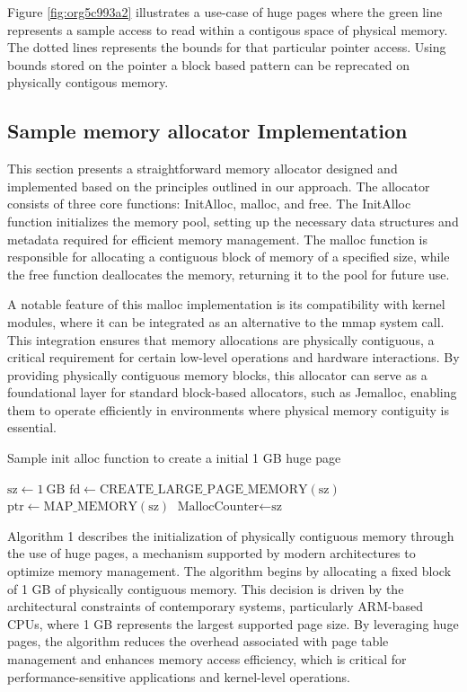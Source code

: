 \documentclass[11pt]{article}
\begin{document}
Figure \ref{fig:org5c993a2} illustrates a use-case of huge pages where the green
line represents a sample access to read within a contigous
space of physical memory. The dotted lines represents the
bounds for that particular pointer access. Using bounds
stored on the pointer a block based pattern can be reprecated
on physically contigous memory. 

\subsection{Sample memory allocator Implementation}
\label{sec:org61472fd}
This section presents a straightforward memory allocator designed and implemented based on the 
principles outlined in our approach. The allocator consists of three core functions: InitAlloc, 
malloc, and free. The InitAlloc function initializes the memory pool, setting up the necessary 
data structures and metadata required for efficient memory management. The malloc function is 
responsible for allocating a contiguous block of memory of a specified size, while the free 
function deallocates the memory, returning it to the pool for future use.

A notable feature of this malloc implementation is its compatibility with kernel modules, 
where it can be integrated as an alternative to the mmap system call. This integration 
ensures that memory allocations are physically contiguous, a critical requirement for 
certain low-level operations and hardware interactions. By providing physically contiguous 
memory blocks, this allocator can serve as a foundational layer for standard block-based allocators, 
such as Jemalloc, enabling them to operate efficiently in environments where physical memory 
contiguity is essential.

\begin{algorithm}
\caption{Sample init alloc function to create a initial 1 GB huge page}
\begin{algorithmic}[1]
    \State $\text{sz} \gets 1\ \text{GB}$ 
    \State $\text{fd} \gets \text{CREATE\_LARGE\_PAGE\_MEMORY}(\text{sz})$ 
    \State $\text{ptr} \gets \text{MAP\_MEMORY}(\text{sz})$ 
    \State $\text{MallocCounter} \gets \text{sz}$ 
\EndFunction
\end{algorithmic}
\end{algorithm}

Algorithm 1 describes the initialization of physically contiguous memory through the use of huge pages,
a mechanism supported by modern architectures to optimize memory management. The algorithm begins by 
allocating a fixed block of 1 GB of physically contiguous memory. This decision is driven by the 
architectural constraints of contemporary systems, particularly ARM-based CPUs, where 1 GB represents 
the largest supported page size. By leveraging huge pages, the algorithm reduces the overhead associated 
with page table management and enhances memory access efficiency, which is critical for performance-sensitive
applications and kernel-level operations.
\end{document}
